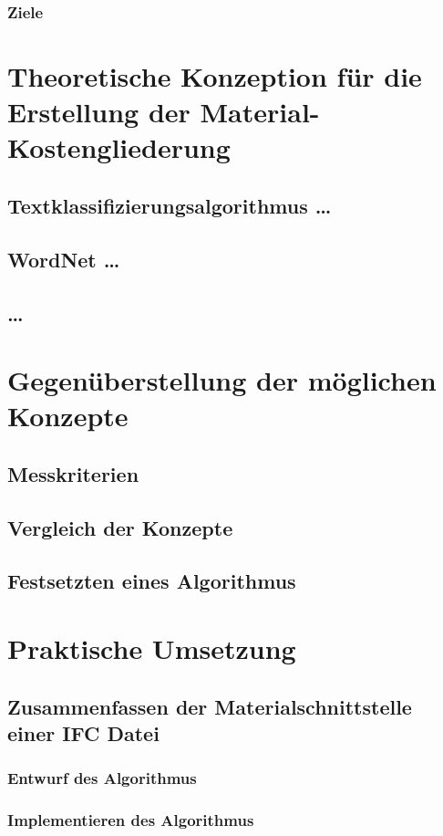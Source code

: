 \subsubsection{Ziele}

\section{Theoretische Konzeption für die Erstellung der Material-Kostengliederung}
\subsection{{Textklassifizierungsalgorithmus \dots}}
\subsection{{WordNet \dots}}
\subsection{\dots}

\section{Gegenüberstellung der möglichen Konzepte}
\subsection{Messkriterien}
\subsection{Vergleich der Konzepte}
\subsection{Festsetzten eines Algorithmus}
\section{Praktische Umsetzung}
\subsection{Zusammenfassen der Materialschnittstelle einer IFC Datei}
\subsubsection{Entwurf des Algorithmus}
\subsubsection{Implementieren des Algorithmus}

